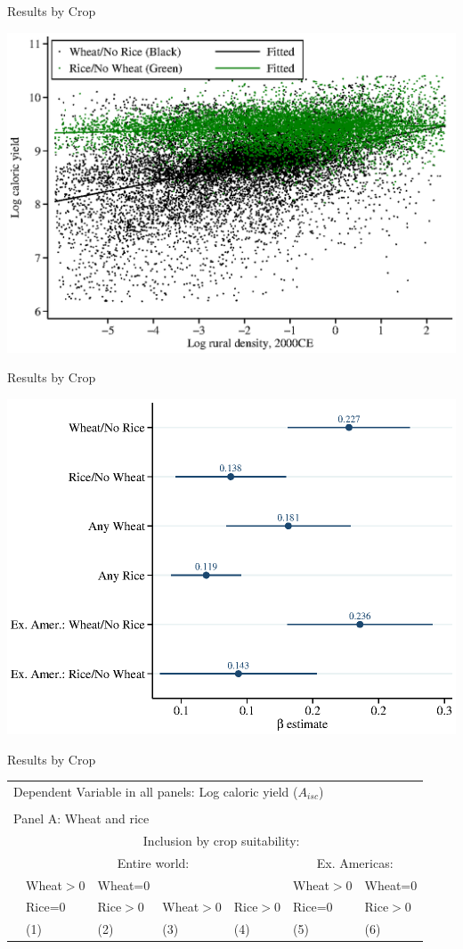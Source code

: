 \documentclass[10pt, xcolor=dvipsnames]{beamer}
\begin{document}
\begin{frame}{Results by Crop}
\begin{center}
\includegraphics[width=.8\textwidth]{fig_beta_crop.eps}
\end{center}
\end{frame}

\begin{frame}{Results by Crop}
\begin{center}
\includegraphics[width=.8\textwidth]{fig_coef_crop.eps}
\end{center}
\end{frame}

\begin{frame}{Results by Crop}

{\scriptsize
\begin{tabularx}{\textwidth}{lXXXXXX}
\midrule
\multicolumn{7}{l}{Dependent Variable in all panels: Log caloric yield ($A_{isc}$)} \\ \\
\multicolumn{7}{l}{Panel A: Wheat and rice} \\
 & \multicolumn{6}{c}{Inclusion by crop suitability:} \\ \cmidrule(lr){2-7}
 & \multicolumn{4}{c}{Entire world:} & \multicolumn{2}{c}{Ex. Americas:}\\ \cmidrule(lr){2-5} \cmidrule(lr){6-7} 
 & Wheat$>$0& Wheat=0 &         &        & Wheat$>$0   & Wheat=0   \\
 & Rice=0 & Rice$>$0  & Wheat$>$0 & Rice$>$0 & Rice=0    & Rice$>$0   \\
 & (1) & (2) & (3) & (4) & (5) & (6) \\
\midrule

\midrule
\end{tabularx}
}
\end{frame}
\end{document}
